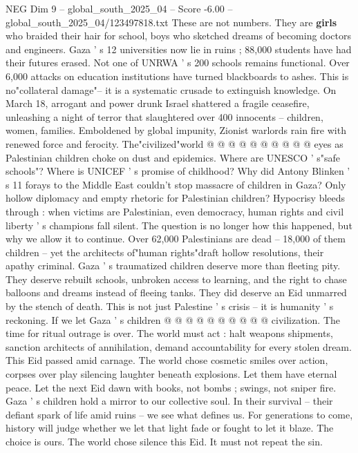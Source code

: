 \begin{textsample}{NEG Dim 9 – global\_south\_2025\_04 – Score -6.00 – global\_south\_2025\_04/123497818.txt}
These are not numbers.
They are \textbf{girls} who braided their hair for school, boys who sketched dreams of becoming doctors and engineers.
Gaza ' s 12 universities now lie in ruins ; 88,000 students have had their futures erased.
Not one of UNRWA ' s 200 schools remains functional.
Over 6,000 attacks on education institutions have turned blackboards to ashes.
This is no"collateral damage"-- it is a systematic crusade to extinguish knowledge.
On March 18, arrogant and power drunk Israel shattered a fragile ceasefire, unleashing a night of terror that slaughtered over 400 innocents -- children, women, families.
Emboldened by global impunity, Zionist warlords rain fire with renewed force and ferocity.
The"civilized"world @ @ @ @ @ @ @ @ @ @ eyes as Palestinian children choke on dust and epidemics.
Where are UNESCO ' s"safe schools"?
Where is UNICEF ' s promise of childhood?
Why did Antony Blinken ' s 11 forays to the Middle East couldn't stop massacre of children in Gaza?
Only hollow diplomacy and empty rhetoric for Palestinian children?
Hypocrisy bleeds through : when victims are Palestinian, even democracy, human rights and civil liberty ' s champions fall silent.
The question is no longer how this happened, but why we allow it to continue.
Over 62,000 Palestinians are dead -- 18,000 of them children -- yet the architects of"human rights"draft hollow resolutions, their apathy criminal.
Gaza ' s traumatized children deserve more than fleeting pity.
They deserve rebuilt schools, unbroken access to learning, and the right to chase balloons and dreams instead of fleeing tanks.
They did deserve an Eid unmarred by the stench of death.
This is not just Palestine ' s crisis -- it is humanity ' s reckoning.
If we let Gaza ' s children @ @ @ @ @ @ @ @ @ @ civilization.
The time for ritual outrage is over.
The world must act : halt weapons shipments, sanction architects of annihilation, demand accountability for every stolen dream.
This Eid passed amid carnage.
The world chose cosmetic smiles over action, corpses over play silencing laughter beneath explosions.
Let them have eternal peace.
Let the next Eid dawn with books, not bombs ; swings, not sniper fire.
Gaza ' s children hold a mirror to our collective soul.
In their survival -- their defiant spark of life amid ruins -- we see what defines us.
For generations to come, history will judge whether we let that light fade or fought to let it blaze.
The choice is ours.
The world chose silence this Eid.
It must not repeat the sin.

\end{textsample}
